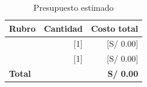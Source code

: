 
\begin{table}[htbp]
  \centering
  \caption{Presupuesto estimado}
  \label{tab:presupuesto}
  \small
  \begin{tabularx}{\textwidth}{@{}Xrr@{}}
    \toprule
    \textbf{Rubro} & \textbf{Cantidad} & \textbf{Costo total} \\
    \midrule
    [Rubro 1] & [1] & [S/ 0.00] \\
    [Rubro 2] & [1] & [S/ 0.00] \\
    \midrule
    \textbf{Total} & & \textbf{S/ 0.00} \\
    \bottomrule
  \end{tabularx}
\end{table}
